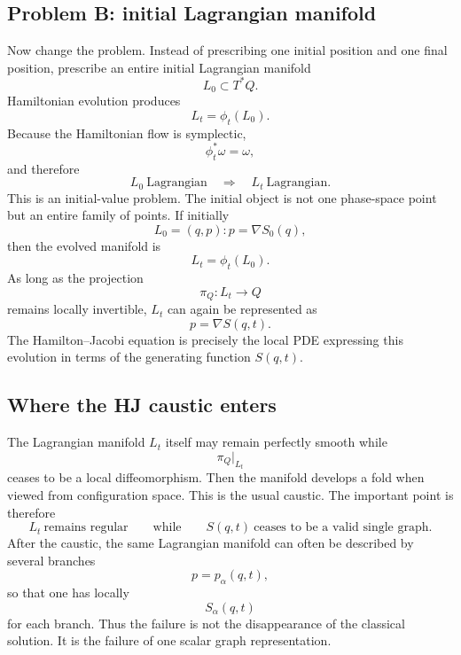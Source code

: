 \subsection{Problem B: initial Lagrangian manifold}
Now change the problem.
Instead of prescribing one initial position and one final position, prescribe
an entire initial Lagrangian manifold
\begin{equation}
L_0\subset T^*Q.
\end{equation}
Hamiltonian evolution produces
\begin{equation}
L_t=\phi_t(L_0).
\end{equation}
Because the Hamiltonian flow is symplectic,
\begin{equation}
\phi_t^*\omega=\omega,
\end{equation}
and therefore
\begin{equation}
L_0\ \text{Lagrangian}
\quad\Longrightarrow\quad
L_t\ \text{Lagrangian}.
\end{equation}
This is an initial-value problem.
The initial object is not one phase-space point but an entire family of
points.
If initially
\begin{equation}
L_0=
{(q,p):p=\nabla S_0(q)},
\end{equation}
then the evolved manifold is
\begin{equation}
L_t=\phi_t(L_0).
\end{equation}
As long as the projection
\begin{equation}
\pi_Q:L_t\longrightarrow Q
\end{equation}
remains locally invertible, \(L_t\) can again be represented as
\begin{equation}
p=\nabla S(q,t).
\end{equation}
The Hamilton--Jacobi equation is precisely the local PDE expressing this
evolution in terms of the generating function \(S(q,t)\).
\subsection{Where the HJ caustic enters}
The Lagrangian manifold \(L_t\) itself may remain perfectly smooth while
\begin{equation}
\pi_Q|_{L_t}
\end{equation}
ceases to be a local diffeomorphism.
Then the manifold develops a fold when viewed from configuration space.
This is the usual caustic.
The important point is therefore
\begin{equation}
\boxed{
L_t\ \text{remains regular}
\qquad\text{while}\qquad
S(q,t)\ \text{ceases to be a valid single graph}.
}
\end{equation}
After the caustic, the same Lagrangian manifold can often be described by
several branches
\begin{equation}
p=p_\alpha(q,t),
\end{equation}
so that one has locally
\begin{equation}
S_\alpha(q,t)
\end{equation}
for each branch.
Thus the failure is not the disappearance of the classical solution.  It is
the failure of one scalar graph representation.
